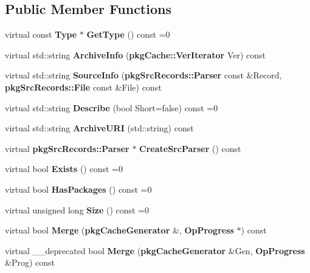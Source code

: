 \subsection*{\-Public \-Member \-Functions}
\begin{DoxyCompactItemize}
\item 
virtual const {\bf \-Type} $\ast$ {\bfseries \-Get\-Type} () const =0\label{classpkgIndexFile_a4350ea0816ec979d2c52ae2a5a61b7ef}

\item 
virtual std\-::string {\bfseries \-Archive\-Info} ({\bf pkg\-Cache\-::\-Ver\-Iterator} \-Ver) const \label{classpkgIndexFile_a684f0beec496bd2bba61e888649f19b7}

\item 
virtual std\-::string {\bfseries \-Source\-Info} ({\bf pkg\-Src\-Records\-::\-Parser} const \&\-Record, {\bf pkg\-Src\-Records\-::\-File} const \&\-File) const \label{classpkgIndexFile_af9f4753934d686d8274e0accc62d3980}

\item 
virtual std\-::string {\bfseries \-Describe} (bool \-Short=false) const =0\label{classpkgIndexFile_a066d0a80c4bd32c4b83733b77d47066d}

\item 
virtual std\-::string {\bfseries \-Archive\-U\-R\-I} (std\-::string) const \label{classpkgIndexFile_ae0236222a74120957d71373c1c608b9f}

\item 
virtual {\bf pkg\-Src\-Records\-::\-Parser} $\ast$ {\bfseries \-Create\-Src\-Parser} () const \label{classpkgIndexFile_a21278b4344aeae000b59cf94e947cefe}

\item 
virtual bool {\bfseries \-Exists} () const =0\label{classpkgIndexFile_af3f7120f52e0c840477b2bda2d197161}

\item 
virtual bool {\bfseries \-Has\-Packages} () const =0\label{classpkgIndexFile_ae5837812509522e5879e7f3dfc2e64e6}

\item 
virtual unsigned long {\bfseries \-Size} () const =0\label{classpkgIndexFile_a70f4905136e34176d235b915b6d15fea}

\item 
virtual bool {\bfseries \-Merge} ({\bf pkg\-Cache\-Generator} \&, {\bf \-Op\-Progress} $\ast$) const \label{classpkgIndexFile_a867edad21a3726540c02a389aa10da41}

\item 
virtual \-\_\-\-\_\-deprecated bool {\bfseries \-Merge} ({\bf pkg\-Cache\-Generator} \&\-Gen, {\bf \-Op\-Progress} \&\-Prog) const \label{classpkgIndexFile_a5c262d637b30c5415c67d145586be638}


\end{DoxyCompactItemize}
